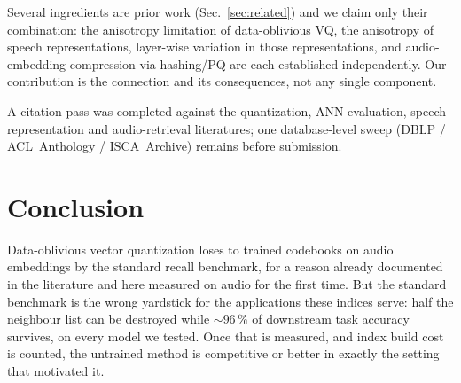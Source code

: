 \documentclass[conference]{IEEEtran}
\begin{document}
Several ingredients are prior work (Sec.~\ref{sec:related}) and we claim only their combination:
the anisotropy limitation of data-oblivious VQ, the anisotropy of speech representations,
layer-wise variation in those representations, and audio-embedding compression via hashing/PQ are
each established independently. Our contribution is the connection and its consequences, not any
single component.

A citation pass was completed against the quantization, ANN-evaluation, speech-representation and
audio-retrieval literatures; one database-level sweep (DBLP / ACL~Anthology / ISCA~Archive) remains
before submission.

\section{Conclusion}

Data-oblivious vector quantization loses to trained codebooks on audio embeddings by the standard
recall benchmark, for a reason already documented in the literature and here measured on audio for
the first time. But the standard benchmark is the wrong yardstick for the applications these
indices serve: half the neighbour list can be destroyed while ${\sim}96\,\%$ of downstream task
accuracy survives, on every model we tested. Once that is measured, and index build cost is
counted, the untrained method is competitive or better in exactly the setting that motivated it.
\end{document}
